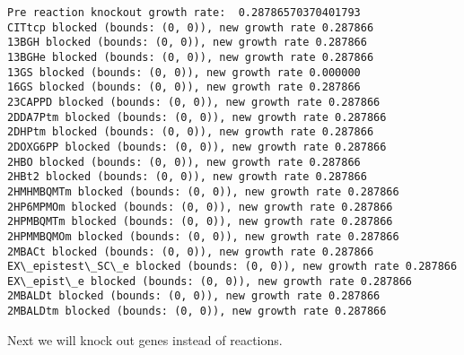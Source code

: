 \documentclass[11pt]{article}
\begin{document}
    \begin{Verbatim}[commandchars=\\\{\}]
Pre reaction knockout growth rate:  0.28786570370401793
CITtcp blocked (bounds: (0, 0)), new growth rate 0.287866
13BGH blocked (bounds: (0, 0)), new growth rate 0.287866
13BGHe blocked (bounds: (0, 0)), new growth rate 0.287866
13GS blocked (bounds: (0, 0)), new growth rate 0.000000
16GS blocked (bounds: (0, 0)), new growth rate 0.287866
23CAPPD blocked (bounds: (0, 0)), new growth rate 0.287866
2DDA7Ptm blocked (bounds: (0, 0)), new growth rate 0.287866
2DHPtm blocked (bounds: (0, 0)), new growth rate 0.287866
2DOXG6PP blocked (bounds: (0, 0)), new growth rate 0.287866
2HBO blocked (bounds: (0, 0)), new growth rate 0.287866
2HBt2 blocked (bounds: (0, 0)), new growth rate 0.287866
2HMHMBQMTm blocked (bounds: (0, 0)), new growth rate 0.287866
2HP6MPMOm blocked (bounds: (0, 0)), new growth rate 0.287866
2HPMBQMTm blocked (bounds: (0, 0)), new growth rate 0.287866
2HPMMBQMOm blocked (bounds: (0, 0)), new growth rate 0.287866
2MBACt blocked (bounds: (0, 0)), new growth rate 0.287866
EX\_epistest\_SC\_e blocked (bounds: (0, 0)), new growth rate 0.287866
EX\_epist\_e blocked (bounds: (0, 0)), new growth rate 0.287866
2MBALDt blocked (bounds: (0, 0)), new growth rate 0.287866
2MBALDtm blocked (bounds: (0, 0)), new growth rate 0.287866
    \end{Verbatim}

    Next we will knock out genes instead of reactions.
\end{document}
